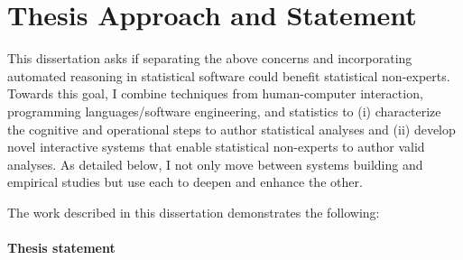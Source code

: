 

\begin{comment}
One naive approach....
The naive approach would be to provide analysts with software that automatically tells them which analyses to use.

But that approach is not enough. Therefore, we should look at fundamentally
changing how we write code -- evolution vs. revolution? 
\end{comment}

\section{Thesis Approach and Statement}
This dissertation asks if separating the above concerns and incorporating
automated reasoning in statistical software could benefit statistical
non-experts. Towards this goal, I combine techniques from human-computer
interaction, programming languages/software engineering, and statistics to (i)
characterize the cognitive and operational steps to author statistical analyses
and (ii) develop novel interactive systems that enable statistical non-experts
to author valid analyses. As detailed below, I not only move between systems
building and empirical studies but use each to deepen and enhance the other.

The work described in this dissertation demonstrates the following:%
\paragraph{Thesis statement} \label{para:thesisStatement}


